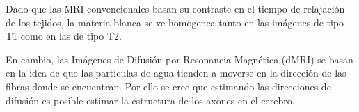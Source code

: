 Dado que las MRI convencionales basan su contraste en el tiempo de relajaci\'on
de los tejidos, la materia blanca se ve homogenea tanto en las im\'agenes de tipo
T1 como en las de tipo T2. 

En cambio, las Im\'agenes de Difusi\'on por
Resonancia Magn\'etica (dMRI) se basan en la idea de que las particulas 
de agua tienden a moverse en la direcci\'on de las fibras donde se encuentran.
Por ello se cree que estimando las direcciones de difusi\'on es posible estimar
la estructura de los axones en el cerebro.

\newpage
